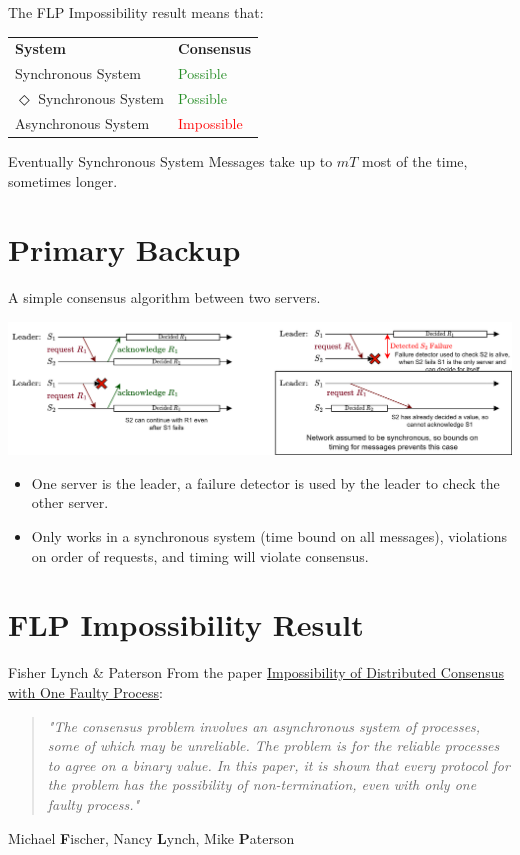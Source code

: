 \noindent The FLP Impossibility result means that:
\begin{center}
    \begin{tabular}{l l}
        \textbf{System}               & \textbf{Consensus}                \\
        Synchronous System            & \textcolor{ForestGreen}{Possible} \\
        $\Diamond$ Synchronous System & \textcolor{ForestGreen}{Possible} \\
        Asynchronous System           & \textcolor{red}{Impossible}       \\
    \end{tabular}
\end{center}
\begin{definitionbox}{Eventually Synchronous System}
    Messages take up to $mT$ most of the time, sometimes longer. \\ \toimprove
\end{definitionbox}
\section{Primary Backup}
A simple consensus algorithm between two servers.
\begin{center}
    \includegraphics[width=.9\textwidth]{consensus/images/primary_backup_scenarios.drawio.png}
\end{center}
\begin{itemize}
    \item One server is the leader, a failure detector is used by the leader to check the other server.
    \item Only works in a synchronous system (time bound on all messages), violations on order of requests, and timing will violate consensus.
\end{itemize}

\section{FLP Impossibility Result}
\begin{sidenotebox}{Fisher Lynch \& Paterson}
    From the paper \href{https://groups.csail.mit.edu/tds/papers/Lynch/jacm85.pdf}{Impossibility of Distributed Consensus with One Faulty Process}:
    \begin{quote}
        \textit{"The consensus problem involves an asynchronous system of processes,
            some of which may be unreliable. The problem is for the reliable
            processes to agree on a binary value. In this paper, it is shown that
            every protocol for the problem has the possibility of non-termination,
            even with only one faulty process."}
    \end{quote}
    Michael \textbf{F}ischer, Nancy \textbf{L}ynch, Mike \textbf{P}aterson
\end{sidenotebox}

